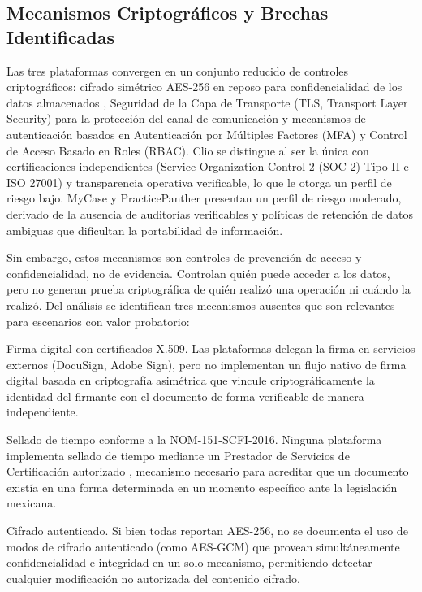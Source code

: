 \subsection{Mecanismos Criptográficos y Brechas Identificadas}\label{sec:mecanismos-brechas}

Las tres plataformas convergen en un conjunto reducido de controles criptográficos: cifrado simétrico AES-256 en reposo para confidencialidad de los datos almacenados \cite{paar2010}, Seguridad de la Capa de Transporte (TLS, Transport Layer Security) para la protección del canal de comunicación y mecanismos de autenticación basados en Autenticación por Múltiples Factores (MFA) y Control de Acceso Basado en Roles (RBAC). Clio se distingue al ser la única con certificaciones independientes (Service Organization Control 2 (SOC 2) Tipo II e ISO 27001) \cite{iso27001} y transparencia operativa verificable, lo que le otorga un perfil de riesgo bajo. MyCase \cite{mycase2025} y PracticePanther \cite{practicepanther2025} presentan un perfil de riesgo moderado, derivado de la ausencia de auditorías verificables y políticas de retención de datos ambiguas que dificultan la portabilidad de información.

Sin embargo, estos mecanismos son controles de prevención de acceso y confidencialidad, no de evidencia. Controlan quién puede acceder a los datos, pero no generan prueba criptográfica de quién realizó una operación ni cuándo la realizó. Del análisis se identifican tres mecanismos ausentes que son relevantes para escenarios con valor probatorio:

Firma digital con certificados X.509. Las plataformas delegan la firma en servicios externos (DocuSign, Adobe Sign), pero no implementan un flujo nativo de firma digital basada en criptografía asimétrica que vincule criptográficamente la identidad del firmante con el documento de forma verificable de manera independiente.

Sellado de tiempo conforme a la NOM-151-SCFI-2016. Ninguna plataforma implementa sellado de tiempo mediante un Prestador de Servicios de Certificación autorizado \cite{nom151_2016}, mecanismo necesario para acreditar que un documento existía en una forma determinada en un momento específico ante la legislación mexicana.

Cifrado autenticado. Si bien todas reportan AES-256, no se documenta el uso de modos de cifrado autenticado (como AES-GCM) que provean simultáneamente confidencialidad e integridad en un solo mecanismo, permitiendo detectar cualquier modificación no autorizada del contenido cifrado.

